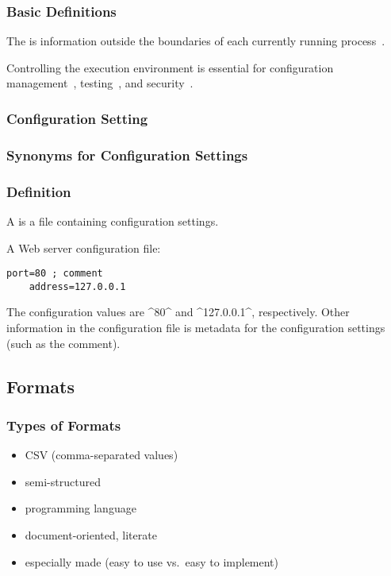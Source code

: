 \begin{frame}
	\frametitle{Basic Definitions}
	The  is information outside the boundaries of each currently running process~\cite{corbato1971multics}.

	Controlling the execution environment is essential for configuration management~\cite{cons2002pan,huang2015confvalley}, testing~\cite{van2010automating,wang2009context}, and security~\cite{goldberg1996secure,schreuders2012towards,perkins2009automatically,liang2003isolated}.
\end{frame}

\begin{frame}
	\frametitle{Configuration Setting}
	
\end{frame}


\begin{frame}[fragile]
	\frametitle{Synonyms for Configuration Settings}
\end{frame}

\begin{frame}[fragile]
	\frametitle{Definition}
	A  is a file containing configuration settings.

	\pause
	A Web server configuration file:

	\begin{lstlisting}[gobble=4]
	port=80 ; comment
	address=127.0.0.1\end{lstlisting}

	\pause

	The configuration values are ^80^ and ^127.0.0.1^, respectively.
	Other information in the configuration file is metadata for the configuration settings (such as the comment).
\end{frame}

\subsection{Formats}

\begin{frame}
	\frametitle{Types of Formats}
	\begin{itemize}
	\item CSV (comma-separated values)
	\item semi-structured
	\item programming language
	\item document-oriented, literate
	\item especially made (easy to use vs.\ easy to implement)
	\end{itemize}
\end{frame}

